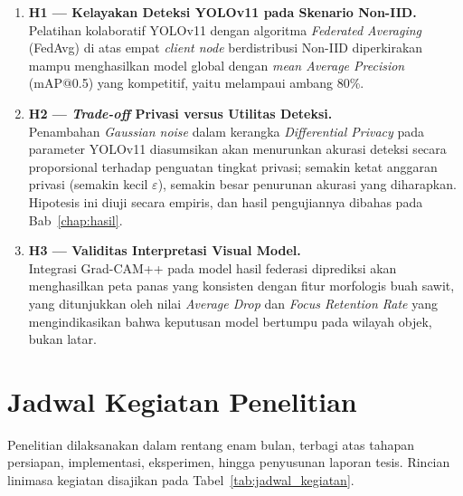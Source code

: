 \begin{enumerate}
    \item \textbf{H1 --- Kelayakan Deteksi YOLOv11 pada Skenario Non-IID.}\\
    Pelatihan kolaboratif YOLOv11 dengan algoritma \emph{Federated Averaging} (FedAvg) di atas empat \emph{client node} berdistribusi Non-IID diperkirakan mampu menghasilkan model global dengan \emph{mean Average Precision} (mAP@0.5) yang kompetitif, yaitu melampaui ambang 80\%.

    \item \textbf{H2 --- \emph{Trade-off} Privasi versus Utilitas Deteksi.}\\
    Penambahan \emph{Gaussian noise} dalam kerangka \emph{Differential Privacy} pada parameter YOLOv11 diasumsikan akan menurunkan akurasi deteksi secara proporsional terhadap penguatan tingkat privasi; semakin ketat anggaran privasi (semakin kecil $\varepsilon$), semakin besar penurunan akurasi yang diharapkan. Hipotesis ini diuji secara empiris, dan hasil pengujiannya dibahas pada Bab~\ref{chap:hasil}.

    \item \textbf{H3 --- Validitas Interpretasi Visual Model.}\\
    Integrasi Grad-CAM++ pada model hasil federasi diprediksi akan menghasilkan peta panas yang konsisten dengan fitur morfologis buah sawit, yang ditunjukkan oleh nilai \emph{Average Drop} dan \emph{Focus Retention Rate} yang mengindikasikan bahwa keputusan model bertumpu pada wilayah objek, bukan latar.
\end{enumerate}

\section{Jadwal Kegiatan Penelitian}
\label{sec:jadwal-penelitian}
Penelitian dilaksanakan dalam rentang enam bulan, terbagi atas tahapan persiapan, implementasi, eksperimen, hingga penyusunan laporan tesis. Rincian linimasa kegiatan disajikan pada Tabel~\ref{tab:jadwal_kegiatan}.

